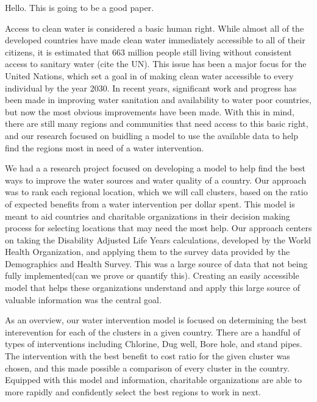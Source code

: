 Hello. This is going to be a good paper.

Access to clean water is considered a basic human right. While almost all of the developed countries have made clean water immediately accessible to all of their citizens, it is estimated that 663 million people still living without consistent access to sanitary water (cite the UN). This issue has been a major focus for the United Nations, which set a goal in of making clean water accessible to every individual by the year 2030. In recent years, significant work and progress has been made in improving water sanitation and availability to water poor countries, but now the most obvious improvements have been made. With this in mind, there are still many regions and communities that need access to this basic right, and our research focused on buidling a model to use the available data to help find the regions most in need of a water intervention.

We had a a research project focused on developing a model to help find the best ways to improve the water sources and water quality of a country. Our approach was to rank each regional location, which we will call clusters, based on the ratio of expected benefits from a water intervention per dollar spent. This model is meant to aid countries and charitable organizations in their decision making process for selecting locations that may need the most help. Our approach centers on taking the Disability Adjusted Life Years calculations, developed by the World Health Organization, and applying them to the survey data provided by the Demographics and Health Survey. This was a large source of data that not being fully implemented(can we prove or quantify this). Creating an easily accessible model that helps these organizations understand and apply this large source of valuable information was the central goal.
	
As an overview, our water intervention model is focused on determining the best interevention for each of the clusters in a given country. There are a handful of types of interventions including Chlorine, Dug well, Bore hole, and stand pipes. The intervention with the best benefit to cost ratio for the given cluster was chosen, and this made possible a comparison of every cluster in the country. Equipped with this model and information, charitable organizations are able to more rapidly and confidently select the best regions to work in next.